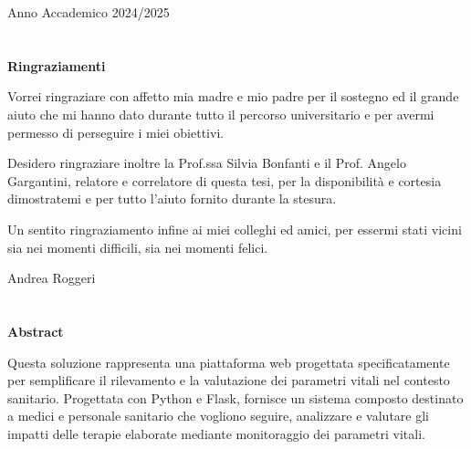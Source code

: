\documentclass[12pt,a4paper,oneside]{report}
\begin{document}
\begin{titlepage}
    \vfill

    \begin{center}
        {\fontsize{12}{14}\selectfont Anno Accademico 2024/2025}
    \end{center}
\end{titlepage}

\chapter*{}
\thispagestyle{empty}

\begin{center}
    \textbf{Ringraziamenti}
\end{center}

\vspace{0.5cm}

Vorrei ringraziare con affetto mia madre e mio padre per il sostegno ed il grande aiuto che mi hanno dato durante tutto il percorso universitario e per avermi permesso di perseguire i miei obiettivi.

Desidero ringraziare inoltre la Prof.ssa Silvia Bonfanti e il Prof. Angelo Gargantini, relatore e correlatore di questa tesi, per la disponibilità e cortesia dimostratemi e per tutto l'aiuto fornito durante la stesura.

Un sentito ringraziamento infine ai miei colleghi ed amici, per essermi stati vicini sia nei momenti difficili, sia nei momenti felici.

\vfill
\begin{flushright}
    Andrea Roggeri
\end{flushright}

\newpage

\chapter*{}
\thispagestyle{empty}

\begin{center}
    \textbf{Abstract}
\end{center}

\vspace{0.5cm}

Questa soluzione rappresenta una piattaforma web progettata specificatamente per semplificare il rilevamento e la valutazione dei parametri vitali nel contesto sanitario. Progettata con Python e Flask, fornisce un sistema composto destinato a medici e personale sanitario che vogliono seguire, analizzare e valutare gli impatti delle terapie elaborate mediante monitoraggio dei parametri vitali.
\end{document}
